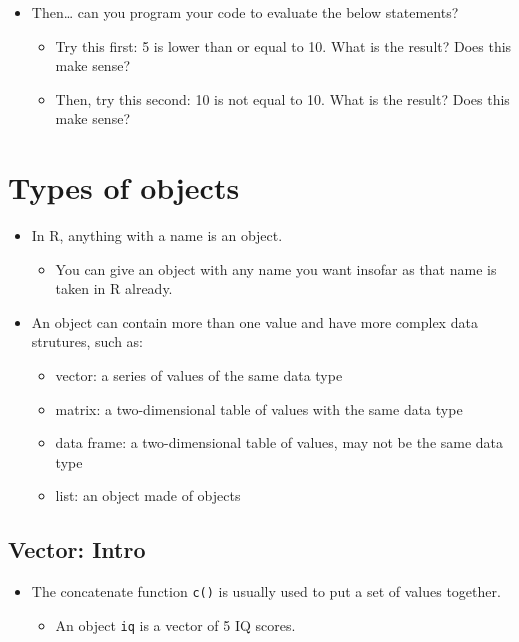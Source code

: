 \documentclass[
]{book}
\providecommand{\tightlist}{%
  \setlength{\itemsep}{0pt}\setlength{\parskip}{0pt}}
\begin{document}
\begin{itemize}
\tightlist
\item
  Then\ldots{} can you program your code to evaluate the below statements?

  \begin{itemize}
  \tightlist
  \item
    Try this first: 5 is lower than or equal to 10. What is the result? Does this make sense?
  \item
    Then, try this second: 10 is not equal to 10. What is the result? Does this make sense?
  \end{itemize}
\end{itemize}

\section{Types of objects}\label{types-of-objects}

\begin{itemize}
\tightlist
\item
  In R, anything with a name is an object.

  \begin{itemize}
  \tightlist
  \item
    You can give an object with any name you want insofar as that name is taken in R already.
  \end{itemize}
\item
  An object can contain more than one value and have more complex data strutures, such as:

  \begin{itemize}
  \tightlist
  \item
    vector: a series of values of the same data type
  \item
    matrix: a two-dimensional table of values with the same data type
  \item
    data frame: a two-dimensional table of values, may not be the same data type
  \item
    list: an object made of objects
  \end{itemize}
\end{itemize}

\subsection{Vector: Intro}\label{vector-intro}

\begin{itemize}
\tightlist
\item
  The concatenate function \texttt{c()} is usually used to put a set of values together.

  \begin{itemize}
  \tightlist
  \item
    An object \texttt{iq} is a vector of 5 IQ scores.
  \end{itemize}
\end{itemize}
\end{document}
